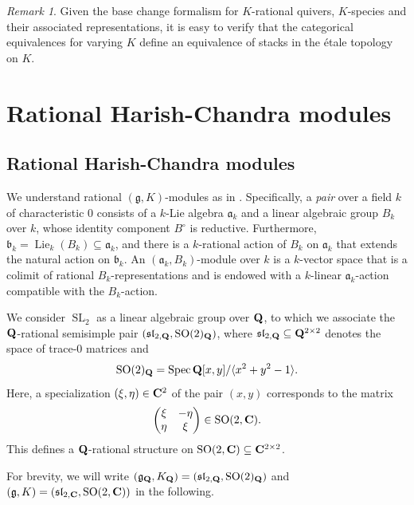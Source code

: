 \documentclass[a4paper,12pt,reqno]{amsart}
\newcommand{\CC}{{\rm\bf C}}
\newcommand{\QQ}{{\rm\bf Q}}
\DeclareMathOperator{\Spec}{\mathrm{Spec}}
\DeclareMathOperator{\SL}{\mathrm{SL}}
\DeclareMathOperator{\SO}{\mathrm{SO}}
\DeclareMathOperator{\Lie}{\mathrm{Lie}}
\theoremstyle{plain}
\theoremstyle{remark}
\newtheorem{remark}[theorem]{Remark}
\begin{document}
  \begin{remark}
    Given the base change formalism for $K$-rational quivers, $K$-species and their associated representations, it is easy to verify that the categorical equivalences for varying $K$ define an equivalence of stacks in the \'etale topology on $K$.
  \end{remark}

\section{Rational Harish-Chandra modules}\label{sec:HC}

\subsection{Rational Harish-Chandra modules}

  We understand rational $(\mathfrak{g}, K)$-modules as in \cite{Januszewski18}. Specifically, a \emph{pair} over a field $k$ of characteristic 0 consists of a $k$-Lie algebra $\mathfrak{a}_k$ and a linear algebraic group $B_k$ over $k$, whose identity component $B^\circ$ is reductive. Furthermore, $\mathfrak{b}_k = \Lie_k(B_k) \subseteq \mathfrak{a}_k$, and there is a $k$-rational action of $B_k$ on $\mathfrak{a}_k$ that extends the natural action on $\mathfrak{b}_k$. An $(\mathfrak{a}_k, B_k)$-module over $k$ is a $k$-vector space that is a colimit of rational $B_k$-representations and is endowed with a $k$-linear $\mathfrak{a}_k$-action compatible with the $B_k$-action.

  We consider $\SL_2$ as a linear algebraic group over $\QQ$, to which we associate the $\QQ$-rational semisimple pair $(\mathfrak{sl}_{2,\QQ}, \SO(2)_\QQ)$, where $\mathfrak{sl}_{2,\QQ} \subseteq \QQ^{2\times 2}$ denotes the space of trace-0 matrices and
  \[
  \SO(2)_\QQ = \Spec \QQ[x, y]/\langle x^2 + y^2 - 1\rangle.
  \]
  Here, a specialization $(\xi,\eta)\in\CC^2$ of the pair $(x,y)$ corresponds to the matrix
  \[
  \begin{pmatrix} \xi & -\eta \\ \eta & \xi \end{pmatrix} \in \SO(2,\CC).
  \]
  This defines a $\QQ$-rational structure on $\SO(2, \CC) \subseteq \CC^{2\times 2}$.
  
  For brevity, we will write $(\mathfrak{g}_\QQ, K_\QQ) = (\mathfrak{sl}_{2,\QQ}, \SO(2)_\QQ)$ and $(\mathfrak{g}, K) = (\mathfrak{sl}_{2,\CC}, \SO(2, \CC))$ in the following.
  
  
\end{document}
